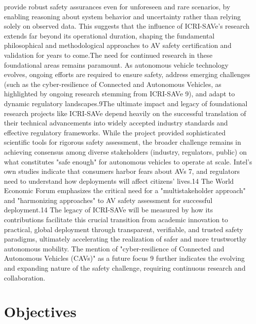 provide robust safety assurances even for unforeseen and rare scenarios, by enabling reasoning about system behavior and uncertainty rather than relying solely on observed data. This suggests that the influence of ICRI-SAVe's research extends far beyond its operational duration, shaping the fundamental philosophical and methodological approaches to AV safety certification and validation for years to come.The need for continued research in these foundational areas remains paramount. As autonomous vehicle technology evolves, ongoing efforts are required to ensure safety, address emerging challenges (such as the cyber-resilience of Connected and Autonomous Vehicles, as highlighted by ongoing research stemming from ICRI-SAVe 9), and adapt to dynamic regulatory landscapes.9The ultimate impact and legacy of foundational research projects like ICRI-SAVe depend heavily on the successful translation of their technical advancements into widely accepted industry standards and effective regulatory frameworks. While the project provided sophisticated scientific tools for rigorous safety assessment, the broader challenge remains in achieving consensus among diverse stakeholders (industry, regulators, public) on what constitutes "safe enough" for autonomous vehicles to operate at scale. Intel's own studies indicate that consumers harbor fears about AVs 7, and regulators need to understand how deployments will affect citizens' lives.14 The World Economic Forum emphasizes the critical need for a "multistakeholder approach" and "harmonizing approaches" to AV safety assessment for successful deployment.14 The legacy of ICRI-SAVe will be measured by how its contributions facilitate this crucial transition from academic innovation to practical, global deployment through transparent, verifiable, and trusted safety paradigms, ultimately accelerating the realization of safer and more trustworthy autonomous mobility. The mention of "cyber-resilience of Connected and Autonomous Vehicles (CAVs)" as a future focus 9 further indicates the evolving and expanding nature of the safety challenge, requiring continuous research and collaboration.

\section{Objectives}
